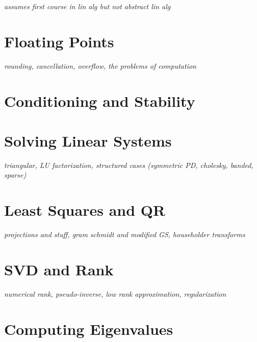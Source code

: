 \documentclass[../../../main.tex]{subfiles}
\begin{document}

\textit{assumes first course in lin alg but not abstract lin alg}

\section{Floating Points}
\textit{rounding, cancellation, overflow, the problems of computation}
\section{Conditioning and Stability}
\section{Solving Linear Systems}
\textit{triangular, LU factorization, structured cases (symmetric PD, cholesky, banded, sparse)}
\section{Least Squares and QR}
\textit{projections and stuff, gram schmidt and modified GS, householder transforms}
\section{SVD and Rank}
\textit{numerical rank, pseudo-inverse, low rank approximation, regularization}
\section{Computing Eigenvalues}

\printbibliography[
    heading=subbibintoc,
    title={References}
]
\end{document}
